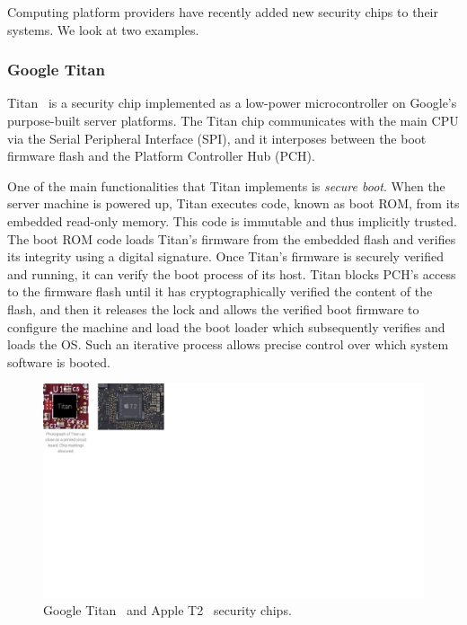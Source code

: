 \documentclass[letterpaper,twocolumn,10pt]{article}
\begin{document}
Computing platform providers have recently added new security chips to their systems. We look at two examples.


\subsubsection*{Google Titan}

Titan~\cite{titan} is a security chip implemented as a low-power microcontroller on Google's purpose-built server platforms. The Titan chip communicates with the main CPU via the Serial Peripheral Interface (SPI), and it interposes between the boot firmware flash and the Platform Controller Hub (PCH).

 One of the main functionalities that Titan implements is \emph{secure boot}. When the server machine is powered up, Titan executes code, known as boot ROM, from its embedded read-only memory. This code is immutable and thus implicitly trusted. The boot ROM code loads Titan's firmware from the embedded flash and verifies its integrity using a digital signature. Once Titan's firmware is securely verified and running, it can verify the boot process of its host. Titan blocks PCH's access to the firmware flash until it has cryptographically verified the content of the flash, and then it releases the lock and allows the verified boot firmware to configure the machine and load the boot loader which subsequently verifies and loads the OS. Such an iterative process allows precise control over which system software is booted. 

\begin{figure}[t]
    \centering
    \includegraphics[scale=0.7]{chips.pdf}
    \caption{Google Titan~\cite{titan} and Apple T2~\cite{t2} security chips.}
\label{fig:prototype}   
\end{figure}
\end{document}
